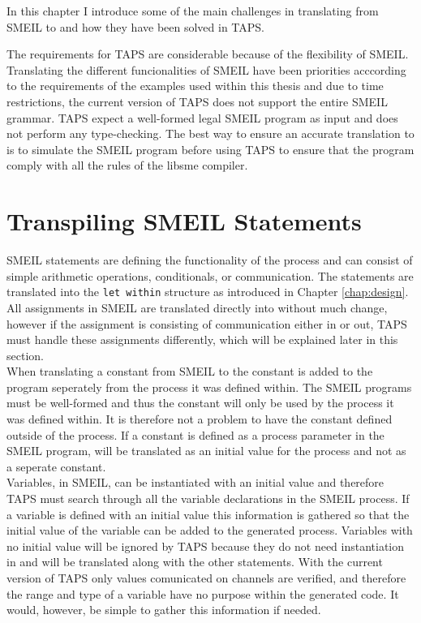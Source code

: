 In this chapter I introduce some of the main challenges in translating from SMEIL to \cspm{} and how they have been solved in TAPS.

The requirements for TAPS are considerable because of the flexibility of SMEIL. Translating the different funcionalities of SMEIL have been priorities acccording to the requirements of the examples used within this thesis and due to time restrictions, the current version of TAPS does not support the entire SMEIL grammar. TAPS expect a well-formed legal SMEIL program as input and does not perform any type-checking. The best way to ensure an accurate translation to \cspm{} is to simulate the SMEIL program before using TAPS to ensure that the program comply with all the rules of the libsme compiler.
\section{Transpiling SMEIL Statements}
SMEIL statements are defining the functionality of the process and can consist of simple arithmetic operations, conditionals, or communication.
The statements are translated into the \texttt{let within} structure as introduced in Chapter \ref{chap:design}.\\

All assignments in SMEIL are translated directly into \cspm{} without much change, however if the assignment is consisting of communication either in or out, TAPS must handle these assignments differently, which will be explained later in this section.\\

When translating a constant from SMEIL to \cspm{} the constant is added to the \cspm{} program seperately from the process it was defined within.
The SMEIL programs must be well-formed and thus the constant will only be used by the process it was defined within. It is therefore not a problem to have the constant defined outside of the \cspm{} process. If a constant is defined as a process parameter in the SMEIL program, will be translated as an initial value for the process and not as a seperate \cspm{} constant.\\

Variables, in SMEIL, can be instantiated with an initial value and therefore TAPS must search through all the variable declarations in the SMEIL process. If a variable is defined with an initial value this information is gathered so that the initial value of the variable can be added to the generated \cspm{} process.
Variables with no initial value will be ignored by TAPS because they do not need instantiation in \cspm{} and will be translated along with the other statements. With the current version of TAPS only values comunicated on channels are verified, and therefore the range and type of a variable have no purpose within the generated \cspm{} code. It would, however, be simple to gather this information if needed.\\

